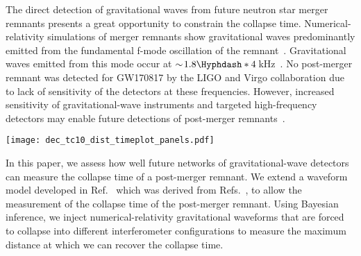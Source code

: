 \documentclass[../Thesis.tex]{subfiles}
\begin{document}
    The direct detection of gravitational waves from future neutron star merger remnants presents a great opportunity to constrain the collapse time.
    Numerical-relativity simulations of merger remnants show gravitational waves predominantly emitted from the fundamental f-mode oscillation of the remnant~\cite{Zhuge1994,Stergioulas2011}.
    Gravitational waves emitted from this mode occur at $\sim\!1.8\Hyphdash*4$\,kHz~\cite{Takami2015,Bernuzzi2015}.
    No post-merger remnant was detected for GW170817 by the LIGO and Virgo collaboration due to lack of sensitivity of the detectors at these frequencies. 
    However, increased sensitivity of gravitational-wave instruments and targeted high-frequency detectors  may enable future detections of post-merger remnants~\cite[e.g.,][]{Martynov2019,NEMO2020}. \par
    \begin{figure*}
        \centering
        \texttt{[image: dec\_tc10\_dist\_timeplot\_panels.pdf]}
        \caption{Time domain posterior waveforms for SLy equation of state with equal-mass 1.35M${_\odot}$ progenitor (left panels) and measured collapse times (right panels) for injections with collapse times $\tc=5$\,ms~(top), $\tc=10$\,ms~(centre), and $\tc=15$\,ms~(bottom) injected into 2A+ detector network. Left panels show the numerical-relativity injections that have been forced to collapse (black curves) with the posterior waveforms (shaded blue curves). The right panels show the collapse-time posterior distributions for each numerical-relativity injection.
        The solid vertical lines on all panels shows  $\tc$ for the injected waveform. The dashed vertical lines shows  $\tc+\tw$ where the injected signal drops to zero due to the induced collapse. Here we show three loud injections from our injection study where $\tc$ are clearly recovered. The injected distances are 5.93\,Mpc, 3.04\,Mpc, and 1.00\,Mpc, for 5\,ms,  10\,ms, and  15\,ms respectively. The full posteriors for the $\tc=10\,$ms collapse time   injection are shown in the appendix (Fig~\ref{fig:FullCorner}).} 
        \label{fig:TimeResponse}
\end   {figure*}
\pagebreak
    In this paper, we assess how well future networks of gravitational-wave detectors can measure the collapse time of a post-merger remnant.
    We extend a waveform model developed in Ref.~\cite{Easter2020} which was derived from Refs.~\cite{Bauswein2016,Bose2018}, to allow the measurement of the collapse time of the post-merger remnant.
    Using Bayesian inference, we inject numerical-relativity gravitational waveforms that are forced to collapse into different interferometer configurations to measure the maximum distance at which we can recover the collapse time.\par
\end{document}
